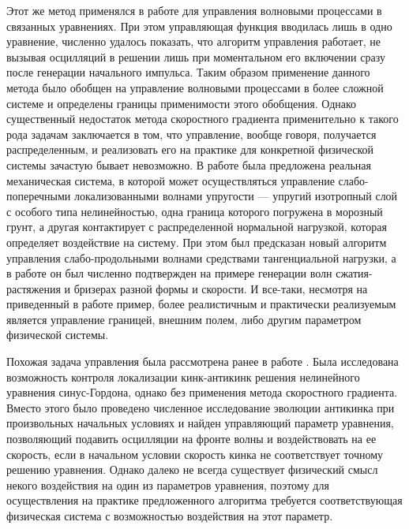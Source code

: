 Этот же метод применялся в работе \cite{porant17} для управления волновыми процессами в связанных уравнениях. При этом управляющая функция вводилась лишь в одно уравнение, численно удалось показать, что алгоритм управления работает, не вызывая осцилляций в решении лишь при моментальном его включении сразу после генерации начального импульса. Таким образом применение данного метода было обобщен на управление волновыми процессами в более сложной системе и определены границы применимости этого обобщения.
Однако существенный недостаток метода скоростного градиента применительно к такого рода задачам заключается в том, что управление, вообще говоря, получается распределенным, и реализовать его на практике для конкретной физической системы зачастую бывает невозможно. В работе \cite{PorubovAntonov2018mechSystem} была предложена реальная механическая система, в которой может осуществляться управление слабо-поперечными локализованными волнами упругости --- упругий изотропный слой с особого типа нелинейностью, одна граница которого погружена в морозный грунт, а другая контактирует с распределенной нормальной нагрузкой, которая определяет воздействие на систему. При этом был предсказан новый алгоритм управления слабо-продольными волнами средствами тангенциальной нагрузки, а в работе \cite{PorubovAntonov2017JoPFurther} он был численно подтвержден на примере генерации волн сжатия-растяжения и бризерах разной формы и скорости. И все-таки, несмотря на приведенный в работе пример, более реалистичным и практически реализуемым является управление границей, внешним полем, либо другим параметром физической системы.

Похожая задача управления была рассмотрена ранее в работе \cite{intro_bondar}. Была исследована возможность контроля локализации кинк-антикинк решения нелинейного уравнения синус-Гордона, однако без применения метода скоростного градиента. Вместо этого было проведено численное исследование эволюции антикинка при произвольных начальных условиях и найден управляющий параметр уравнения, позволяющий подавить осцилляции на фронте волны и воздействовать на ее скорость, если в начальном условии скорость кинка не соответствует точному решению уравнения. Однако далеко не всегда существует физический смысл некого воздействия на один из параметров уравнения, поэтому для осуществления на практике предложенного алгоритма требуется соответствующая физическая система с возможностью воздействия на этот параметр.


